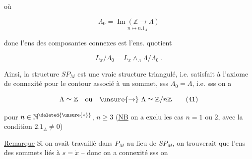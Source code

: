 
où

\[
\Lambda_0=\underset{\scriptstyle n\longmapsto n.1_\Lambda}{\operatorname{Im}(\mathbb{Z}\longrightarrow\Lambda)}
\tag*{(39)}
\]

donc l'ens des composantes connexes est l'ens.  quotient

\[
L_x/\Lambda_0=L_x\mathbin{\wedge}_{\Lambda}\Lambda/\Lambda_0\;.\tag*{(40)}
\]

Ainsi, la structure $SP_M$ est une vraie structure  triangulé,  i.e. satisfait à l'axiome de connexité pour le contour associé à un sommet, sss $\Lambda_0=\Lambda$, i.e. sss on a

\[
\Lambda\simeq\mathbb{Z}\quad\text{ou}\quad\unsure{\rightarrow}\ \Lambda\simeq\mathbb{Z}/n\mathbb{Z}\tag*{(41)}
\]

pour $n\in\mathbb{N}^{\deleted{\unsure{*}}}$, $n\geq 3$ (\uline{NB} on a exclu les cas $n=1$ ou $2$, avec la condition $2.1_\Lambda\ne 0$)

\uline{Remarque} Si on avait travaillé dans $P_M$ au lieu de $SP_M$, on trouverait que  l'ens des sommets liés à $s=\dot{x}$      -- donc on a connexité sss on

